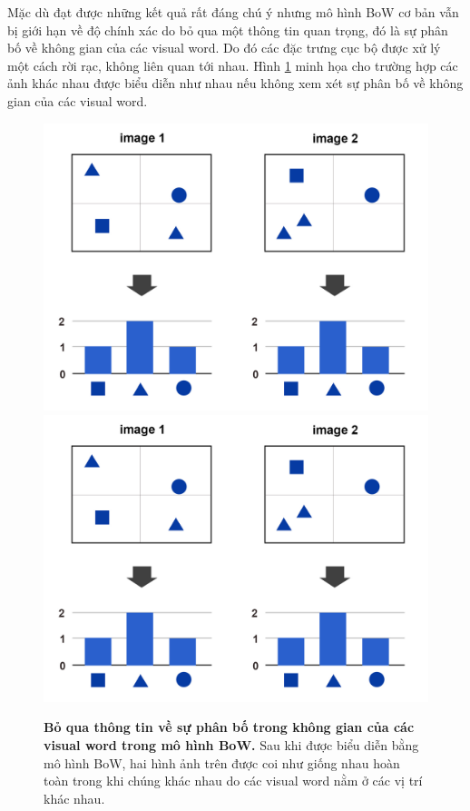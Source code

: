 Mặc dù đạt được những kết quả rất đáng chú ý nhưng mô hình BoW cơ bản vẫn bị giới hạn về độ chính xác do bỏ qua một thông tin quan trọng, đó là sự phân bố về không gian của các visual word. Do đó các đặc trưng cục bộ được xử lý một cách rời rạc, không liên quan tới nhau. Hình \ref{FigLimited} minh họa cho trường hợp các ảnh khác nhau được biểu diễn như nhau nếu không xem xét sự phân bố về không gian của các visual word.
\begin{figure}[!htbp]
  \begin{center}
    \leavevmode
    \ifpdf
      \includegraphics[scale=0.25]{limited}
    \else
      \includegraphics[scale=0.25]{limited}
    \fi
    \caption[Bỏ qua thông tin về sự phân bố trong không gian của các visual word trong mô hình BoW]{\textbf{Bỏ qua thông tin về sự phân bố trong không gian của các visual word trong mô hình BoW.} Sau khi được biểu diễn bằng mô hình BoW, hai hình ảnh trên được coi như giống nhau hoàn toàn trong khi chúng khác nhau do các visual word nằm ở các vị trí khác nhau.}
    \label{FigLimited}
  \end{center}
\end{figure}

